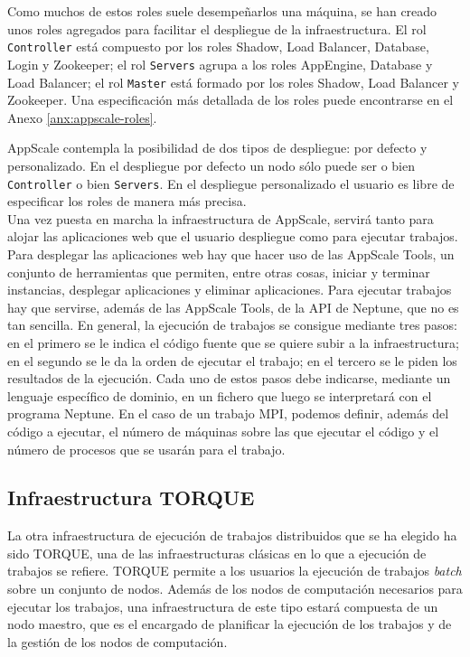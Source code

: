 Como muchos de estos roles suele desempeñarlos una máquina, se han creado unos roles agregados para facilitar el despliegue de la infraestructura. El rol \texttt{Controller} está compuesto por los roles Shadow, Load Balancer, Database, Login y Zookeeper; el rol \texttt{Servers} agrupa a los roles AppEngine, Database y Load Balancer; el rol \texttt{Master} está formado por los roles Shadow, Load Balancer y Zookeeper. Una especificación más detallada de los roles puede encontrarse en el Anexo \ref{anx:appscale-roles}.

AppScale contempla la posibilidad de dos tipos de despliegue: por defecto y personalizado. En el despliegue por defecto un nodo sólo puede ser o bien \texttt{Controller} o bien \texttt{Servers}. En el despliegue personalizado el usuario es libre de especificar los roles de manera más precisa. \\

Una vez puesta en marcha la infraestructura de AppScale, servirá tanto para alojar las aplicaciones web que el usuario despliegue como para ejecutar trabajos. Para desplegar las aplicaciones web hay que hacer uso de las AppScale Tools, un conjunto de herramientas que permiten, entre otras cosas, iniciar y terminar instancias, desplegar aplicaciones y eliminar aplicaciones. Para ejecutar trabajos hay que servirse, además de las AppScale Tools, de la API de Neptune, que no es tan sencilla. En general, la ejecución de trabajos se consigue mediante tres pasos: en el primero se le indica el código fuente que se quiere subir a la infraestructura; en el segundo se le da la orden de ejecutar el trabajo; en el tercero se le piden los resultados de la ejecución. Cada uno de estos pasos debe indicarse, mediante un lenguaje específico de dominio, en un fichero que luego se interpretará con el programa Neptune. En el caso de un trabajo MPI, podemos definir, además del código a ejecutar, el número de máquinas sobre las que ejecutar el código y el número de procesos que se usarán para el trabajo.


\subsection{Infraestructura TORQUE}

La otra infraestructura de ejecución de trabajos distribuidos que se ha elegido ha sido TORQUE, una de las infraestructuras clásicas en lo que a ejecución de trabajos se refiere. TORQUE permite a los usuarios la ejecución de trabajos \emph{batch} sobre un conjunto de nodos. Además de los nodos de computación necesarios para ejecutar los trabajos, una infraestructura de este tipo estará compuesta de un nodo maestro, que es el encargado de planificar la ejecución de los trabajos y de la gestión de los nodos de computación. \\

